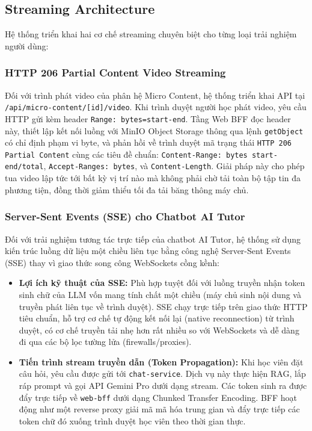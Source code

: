 \subsection{Streaming Architecture}

Hệ thống triển khai hai cơ chế streaming chuyên biệt cho từng loại trải nghiệm người dùng:

\subsubsection{HTTP 206 Partial Content Video Streaming}
Đối với trình phát video của phân hệ Micro Content, hệ thống triển khai API tại \texttt{/api/micro-content/[id]/video}. Khi trình duyệt người học phát video, yêu cầu HTTP gửi kèm header \texttt{Range: bytes=start-end}. Tầng Web BFF đọc header này, thiết lập kết nối luồng với MinIO Object Storage thông qua lệnh \texttt{getObject} có chỉ định phạm vi byte, và phản hồi về trình duyệt mã trạng thái \texttt{HTTP 206 Partial Content} cùng các tiêu đề chuẩn: \texttt{Content-Range: bytes start-end/total}, \texttt{Accept-Ranges: bytes}, và \texttt{Content-Length}. Giải pháp này cho phép tua video lập tức tới bất kỳ vị trí nào mà không phải chờ tải toàn bộ tập tin đa phương tiện, đồng thời giảm thiểu tối đa tải băng thông máy chủ.

\subsubsection{Server-Sent Events (SSE) cho Chatbot AI Tutor}
Đối với trải nghiệm tương tác trực tiếp của chatbot AI Tutor, hệ thống sử
dụng kiến trúc luồng dữ liệu một chiều liên tục bằng công nghệ Server-Sent
Events (SSE) thay vì giao thức song công WebSockets cồng kềnh:

\begin{itemize}
    \item \textbf{Lợi ích kỹ thuật của SSE:} Phù hợp tuyệt đối với luồng
          truyền nhận token sinh chữ của LLM vốn mang tính chất một chiều
          (máy chủ sinh nội dung và truyền phát liên tục về trình duyệt).
          SSE chạy trực tiếp trên giao thức HTTP tiêu chuẩn, hỗ trợ cơ chế
          tự động kết nối lại (native reconnection) từ trình duyệt, có cơ
          chế truyền tải nhẹ hơn rất nhiều so với WebSockets và dễ dàng đi
          qua các bộ lọc tường lửa (firewalls/proxies).
    \item \textbf{Tiến trình stream truyền dẫn (Token Propagation):} Khi
          học viên đặt câu hỏi, yêu cầu được gửi tới \texttt{chat-service}.
          Dịch vụ này thực hiện RAG, lắp ráp prompt và gọi API Gemini Pro
          dưới dạng stream. Các token sinh ra được đẩy trực tiếp về
          \texttt{web-bff} dưới dạng Chunked Transfer Encoding. BFF hoạt
          động như một reverse proxy giải mã mã hóa trung gian và đẩy trực
          tiếp các token chữ đó xuống trình duyệt học viên theo thời gian
          thực.
\end{itemize}

